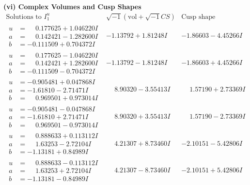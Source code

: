 \documentclass[1p]{elsarticle_modified}
\theoremstyle{definition}
\newcommand{\I}{\sqrt{-1}}
\begin{document}
\newpage\flushleft \textbf{(vi) Complex Volumes and Cusp Shapes}
$$\begin{array}{c|c|c}  
\text{Solutions to }I^u_{1}& \I (\text{vol} + \sqrt{-1}CS) & \text{Cusp shape}\\
 \hline 
\begin{aligned}
u &= \phantom{-}0.177625 + 1.046220 I \\
a &= \phantom{-}0.142421 - 1.282600 I \\
b &= -0.111509 + 0.704372 I\end{aligned}
 & -1.13792 + 1.81248 I & -1.86603 - 4.45266 I \\ \hline\begin{aligned}
u &= \phantom{-}0.177625 - 1.046220 I \\
a &= \phantom{-}0.142421 + 1.282600 I \\
b &= -0.111509 - 0.704372 I\end{aligned}
 & -1.13792 - 1.81248 I & -1.86603 + 4.45266 I \\ \hline\begin{aligned}
u &= -0.905481 + 0.047868 I \\
a &= -1.61810 - 2.71471 I \\
b &= \phantom{-}0.969501 + 0.973014 I\end{aligned}
 & \phantom{-}8.90320 - 3.55413 I & \phantom{-}1.57190 + 2.73369 I \\ \hline\begin{aligned}
u &= -0.905481 - 0.047868 I \\
a &= -1.61810 + 2.71471 I \\
b &= \phantom{-}0.969501 - 0.973014 I\end{aligned}
 & \phantom{-}8.90320 + 3.55413 I & \phantom{-}1.57190 - 2.73369 I \\ \hline\begin{aligned}
u &= \phantom{-}0.888633 + 0.113112 I \\
a &= \phantom{-}1.63253 - 2.72104 I \\
b &= -1.13181 + 0.84989 I\end{aligned}
 & \phantom{-}4.21307 + 8.73460 I & -2.10151 - 5.42806 I \\ \hline\begin{aligned}
u &= \phantom{-}0.888633 - 0.113112 I \\
a &= \phantom{-}1.63253 + 2.72104 I \\
b &= -1.13181 - 0.84989 I\end{aligned}
 & \phantom{-}4.21307 - 8.73460 I & -2.10151 + 5.42806 I \\ \hline\begin{aligned}

\end{aligned}
\end{array}$$
\end{document}
